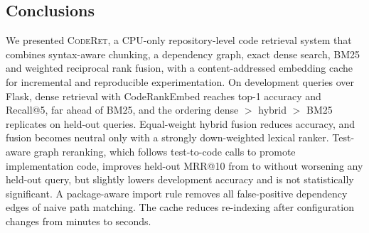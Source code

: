 \documentclass[conference]{IEEEtran}
\newcommand{\sys}{\textsc{CodeRet}}
\begin{document}
\subsection{Conclusions}
We presented \sys{}, a CPU-only repository-level code retrieval system that
combines syntax-aware chunking, a dependency graph, exact dense search, BM25
and weighted reciprocal rank fusion, with a content-addressed embedding cache
for incremental and reproducible experimentation. On \NQueries{} development
queries over Flask, dense retrieval with CodeRankEmbed reaches \DenseAccOne{}
top-1 accuracy and \DenseRFive{} Recall@5, far ahead of BM25, and the ordering
dense $>$ hybrid $>$ BM25 replicates on \HoQueries{} held-out queries.
Equal-weight hybrid fusion reduces accuracy, and fusion becomes neutral only with
a strongly down-weighted lexical ranker. \AblConclusion{} Test-aware graph
reranking, which follows test-to-code calls to promote implementation code,
improves held-out MRR@10 from \HoDenseMRR{} to \HoGDenseMRR{} without worsening
any held-out query, but slightly lowers development accuracy and is not
statistically significant. A package-aware import rule removes all false-positive
dependency edges of naive path matching. The cache reduces re-indexing after
configuration changes from minutes to seconds.
\end{document}
